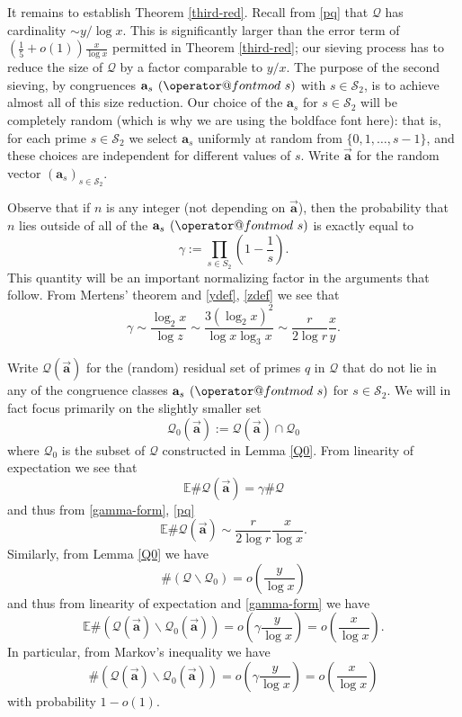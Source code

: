\documentclass[12pt]{amsart}
\makeatletter
\numberwithin{equation}{section}  %
\theoremstyle{remark}
\theoremstyle{plain}
\numberwithin{equation}{section}
\newcommand{\E}{\mathbb{E}}  %
\renewcommand{\pmod}[1]{\allowbreak\mkern7mu({\operator@font mod}\,\,#1)}
\renewcommand{\(}{\left(}
\renewcommand{\)}{\right)}
\newcommand{\asym}{\sim}   %
\newcommand{\vect}[1]{{\ensuremath{\vec{#1}}}}
\newcommand{\QQ}{\mathcal{Q}}
\newcommand{\cS}{\mathcal{S}}
\makeatother
\begin{document}
It remains to establish Theorem \ref{third-red}.
Recall from \eqref{pq} that $\QQ$ has cardinality $\asym y/\log x$.  This is significantly larger than the error term of $(\frac{1}{5}+o(1)) \frac{x}{\log x}$ permitted in Theorem \ref{third-red}; our sieving process has to reduce the size of $\QQ$ by a factor comparable to $y/x$.  The purpose of the second sieving, by congruences $\mathbf{a}_s \pmod{s}$ with $s \in \cS_2$, is to achieve almost all of this size reduction. Our choice of the $\mathbf{a}_s$ for $s \in \cS_2$ will be completely random (which is why we are using the boldface font here): that is, for each prime $s \in \cS_2$ we select $\mathbf{a}_s$ uniformly at random from $\{0,1,\dots, s-1\}$, and these choices are independent for different values of $s$. Write $\vect{\mathbf{a}}$ for the random vector $(\mathbf{a}_s)_{s \in \cS_2}$.

Observe that if $n$ is any integer (not depending on $\vect{\mathbf{a}}$), then the probability that $n$ lies outside of all of the $\mathbf{a}_s \pmod{s}$ is exactly equal to
$$ \gamma := \prod_{s \in S_2} \left(1 - \frac{1}{s}\right).$$
This quantity will be an important normalizing factor in the arguments that follow.
From Mertens' theorem and \eqref{ydef}, \eqref{zdef} we see that
\begin{equation}\label{gamma-form}
\gamma \asym \frac{\log_2 x}{\log z} \asym \frac{3 (\log_2 x)^2}{\log x \log_3 x} \asym  \frac{r}{2\log r} \frac{x}{y}.
\end{equation}

Write $\QQ(\vect{\mathbf{a}})$ for the (random) residual set of primes $q$ in $\QQ$ that do not lie in any of the congruence classes $\mathbf{a}_s \pmod{s}$ for $s \in \cS_2$.  We will in fact focus primarily on the slightly smaller set
$$ \QQ_0(\vect{\mathbf{a}}) := \QQ(\vect{\mathbf{a}}) \cap \QQ_0$$
where $\QQ_0$ is the subset of $\QQ$ constructed in Lemma \ref{Q0}. 
From linearity of expectation we see that
\begin{equation}\label{eqa}
\E \# \QQ(\vect{\mathbf{a}}) = \gamma \# \QQ
\end{equation}
and thus from \eqref{gamma-form}, \eqref{pq}
\begin{equation}\label{qa}
 \E \# \QQ(\vect{\mathbf{a}}) \asym \frac{r}{2\log r} \frac{x}{\log x}.
\end{equation}
Similarly, from Lemma \ref{Q0} we have
$$ \# (\QQ \backslash \QQ_0) = o\left( \frac{y}{\log x} \right)$$
and thus from linearity of expectation and \eqref{gamma-form} we have
$$ \E \# (\QQ(\vect{\mathbf{a}}) \backslash \QQ_0(\vect{\mathbf{a}}) ) = o\left( \gamma \frac{y}{\log x} \right) = o\left( \frac{x}{\log x} \right).$$
In particular, from Markov's inequality we have
\begin{equation}\label{qq-qq0}
\# ( \QQ(\vect{\mathbf{a}}) \backslash \QQ_0(\vect{\mathbf{a}}) ) = o\left( \gamma \frac{y}{\log x} \right) = o\left( \frac{x}{\log x} \right)
\end{equation}
with probability $1-o(1)$.
\end{document}

